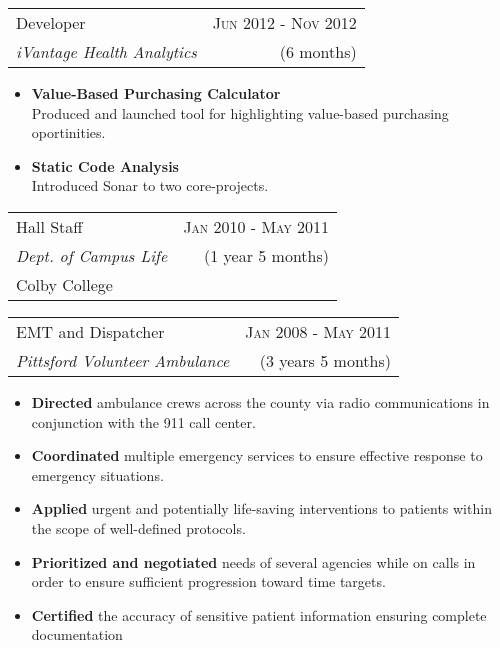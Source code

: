 \documentclass[10pt]{article} %
\begin{document}
{\begin{minipage}[t]{0.5\textwidth}
\begin{tabularx}{\linewidth}{ X r }
  {\large Developer } & {\textsc{Jun 2012 - Nov 2012}} \\
  {\small\textit{iVantage Health Analytics}} & {\small{(6 months)}}
\end{tabularx}

\begin{itemize}
  \item \textbf{Value-Based Purchasing Calculator} \\
    Produced and launched tool for highlighting value-based purchasing oportinities.
  \item \textbf{Static Code Analysis} \\
    Introduced Sonar to two core-projects.
\end{itemize}


\begin{tabularx}{\linewidth}{ X r }
  {\large Hall Staff } & {\textsc{Jan 2010 - May 2011}} \\
  {\small{\textit{Dept. of Campus Life}}} & {\small{(1 year 5 months)}} \\
  {\small{Colby College}} 
\end{tabularx}

\vspace{10pt}


\begin{tabularx}{\linewidth}{ X r }
  {\large EMT and Dispatcher } & {\textsc{Jan 2008 - May 2011}} \\
  {\small\textit{Pittsford Volunteer Ambulance}} & {\small{(3 years 5 months)}}
\end{tabularx}
\begin{itemize}
  \item \textbf{Directed} ambulance crews across the county via radio communications in conjunction with the 911 call center.
  \item \textbf{Coordinated} multiple emergency services to ensure effective response to emergency situations.
  \item \textbf{Applied} urgent and potentially life-saving interventions to patients within the scope of well-defined protocols.
  \item \textbf{Prioritized and negotiated} needs of several agencies while on calls in order to ensure sufficient progression toward time targets.
  \item \textbf{Certified} the accuracy of sensitive patient information ensuring complete documentation
\end{itemize}


\end{minipage}}
\end{document}

